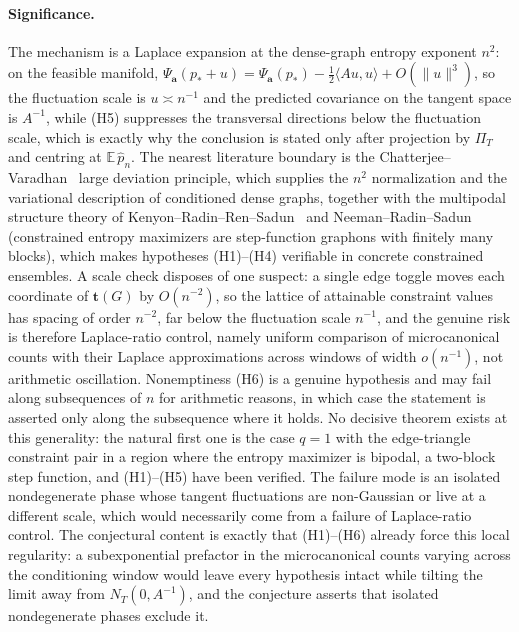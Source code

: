 \documentclass[11pt]{article}
\theoremstyle{definition}
\newcommand{\E}{\mathbb E}
\providecommand{\E}{\mathbb E}
\begin{document}
\paragraph{Significance.}
The mechanism is a Laplace expansion at the dense-graph entropy
exponent $n^2$: on the feasible manifold,
$\Psi_{\mathbf a}(p_*+u)=\Psi_{\mathbf a}(p_*)
-\tfrac12\langle Au,u\rangle+O(\|u\|^3)$, so the fluctuation scale is
$u\asymp n^{-1}$ and the predicted covariance on the tangent space is
$A^{-1}$, while (H5) suppresses the transversal directions below the
fluctuation scale, which is exactly why the conclusion is stated only
after projection by $\Pi_T$ and centring at $\E\,\widehat p_n$.  The
nearest literature boundary is the Chatterjee--Varadhan~\cite{CV11} large
deviation principle, which supplies the $n^2$ normalization and the
variational description of conditioned dense graphs, together with the
multipodal structure theory of Kenyon--Radin--Ren--Sadun~\cite{KRRS17} and Neeman--Radin--Sadun~\cite{NRS23} (constrained entropy maximizers are step-function graphons with finitely many blocks), which makes hypotheses (H1)--(H4) verifiable in
concrete constrained ensembles.  A scale check disposes of one
suspect: a single edge toggle moves each coordinate of
$\mathbf t(G)$ by $O(n^{-2})$, so the lattice of attainable constraint
values has spacing of order $n^{-2}$, far below the fluctuation scale
$n^{-1}$, and the genuine risk is therefore Laplace-ratio control,
namely uniform comparison of microcanonical counts with their Laplace
approximations across windows of width $o(n^{-1})$, not arithmetic
oscillation.  Nonemptiness (H6) is a genuine hypothesis and may fail
along subsequences of $n$ for arithmetic reasons, in which case the
statement is asserted only along the subsequence where it holds.  No
decisive theorem exists at this generality: the natural first one is
the case $q=1$ with the edge-triangle constraint pair in a region where the entropy maximizer is bipodal, a two-block step function, and (H1)--(H5) have been
verified.  The failure mode is an isolated nondegenerate phase whose
tangent fluctuations are non-Gaussian or live at a different scale,
which would necessarily come from a failure of Laplace-ratio control.  The conjectural content is exactly that (H1)--(H6) already force this local regularity: a subexponential prefactor in the microcanonical counts varying across the conditioning window would leave every hypothesis intact while tilting the limit away from $N_T(0,A^{-1})$, and the conjecture asserts that isolated nondegenerate phases exclude it.
\end{document}
